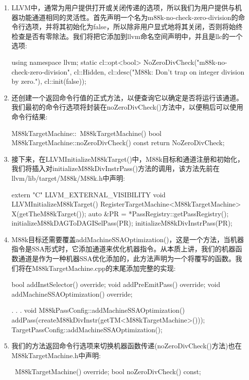 \begin{enumerate}
\item
LLVM中，通常为用户提供打开或关闭传递的选项，所以我们为用户提供与机器功能通道相同的灵活性。首先声明一个名为m88k-no-check-zero-division的命令行选项，并将其初始化为false，所以除非用户显式地将其关闭，否则将始终检查是否有零除法。我们将把它添加到llvm命名空间声明中，并且是llc的一个选项:

\begin{cpp}
using namespace llvm;
static cl::opt<bool>
    NoZeroDivCheck("m88k-no-check-zero-division", cl::Hidden,
                    cl::desc("M88k: Don't trap on integer division by zero."),
                    cl::init(false));
\end{cpp}

\item
还创建一个返回命令行值的正式方法，以便查询它以确定是否将运行该通道。我们最初的命令行选项将封装在noZeroDivCheck()方法中，以便稍后可以使用命令行结果:

\begin{cpp}
M88kTargetMachine::~M88kTargetMachine() {}
bool M88kTargetMachine::noZeroDivCheck() const { return NoZeroDivCheck; }
\end{cpp}

\item
接下来，在LLVMInitializeM88kTarget()中，M88k目标和通道注册和初始化，我们将插入对initializeM88kDivInstrPass()方法的调用，该方法先前在llvm/lib/target/M88k/M88k.h中声明:

\begin{cpp}
extern "C" LLVM_EXTERNAL_VISIBILITY void
LLVMInitializeM88kTarget() {
    RegisterTargetMachine<M88kTargetMachine> X(getTheM88kTarget());
    auto &PR = *PassRegistry::getPassRegistry();
    initializeM88kDAGToDAGISelPass(PR);
    initializeM88kDivInstrPass(PR);
}
\end{cpp}

\item
M88k目标还需要覆盖addMachineSSAOptimization()，这是一个方法，当机器指令是SSA形式时，它添加通道来优化机器指令。从本质上讲，我们的机器函数通道是作为一种机器SSA优化添加的，此方法声明为一个将覆写的函数。我们将在M88kTargetMachine.cpp的末尾添加完整的实现:

\begin{cpp}
    bool addInstSelector() override;
    void addPreEmitPass() override;
    void addMachineSSAOptimization() override;

. . .
void M88kPassConfig::addMachineSSAOptimization() {
    addPass(createM88kDivInstr(getTM<M88kTargetMachine>()));
    TargetPassConfig::addMachineSSAOptimization();
}
\end{cpp}

\item
我们的方法返回命令行选项来切换机器函数传递(noZeroDivCheck()方法)也在M88kTargetMachine.h中声明:

\begin{cpp}
    ~M88kTargetMachine() override;
    bool noZeroDivCheck() const;
\end{cpp}
\end{enumerate}


